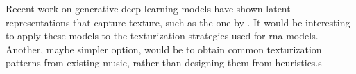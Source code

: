 
Recent work on generative deep learning models have shown
latent representations that capture texture, such as the one
by \textcite{wang2020learning}. It would be interesting to
apply these models to the texturization strategies used for
\gls{rna} models. Another, maybe simpler option, would be to
obtain common texturization patterns from existing music,
rather than designing them from heuristics.s
